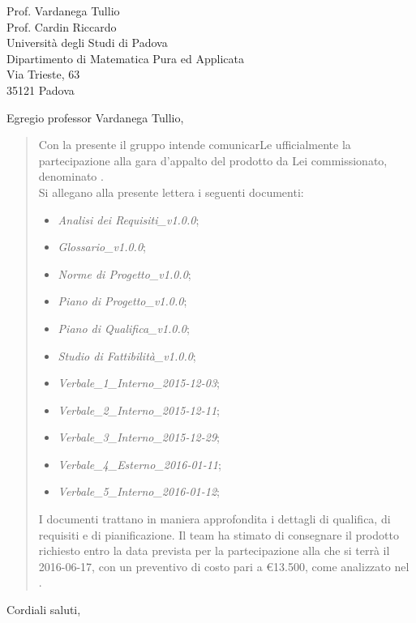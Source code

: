 \documentclass{letter}
\begin{document}

\begin{letter}{\hfill Prof. Vardanega Tullio \\
	\hfill Prof. Cardin Riccardo \\
	\hfill Università degli Studi di Padova \\
	\hfill Dipartimento di Matematica Pura ed Applicata \\
	\hfill Via Trieste, 63 \\
	\hfill 35121 Padova}

\date{}
\opening{Egregio professor Vardanega Tullio,}
 
	\begin{quotation}			
		Con la presente il gruppo \textit{\gruppo} intende comunicarLe ufficialmente la partecipazione alla gara d'appalto del prodotto da Lei commissionato, denominato \textbf{\progetto}.
		\\
		Si allegano alla presente lettera i seguenti documenti:
		\begin{itemize}
			\item \textit{Analisi dei Requisiti\_v1.0.0};
			\item \textit{Glossario\_v1.0.0};
			\item \textit{Norme di Progetto\_v1.0.0};
			\item \textit{Piano di Progetto\_v1.0.0};
			\item \textit{Piano di Qualifica\_v1.0.0};
			\item \textit{Studio di Fattibilità\_v1.0.0};
			\item \textit{Verbale\_1\_Interno\_2015-12-03};
			\item \textit{Verbale\_2\_Interno\_2015-12-11};
			\item \textit{Verbale\_3\_Interno\_2015-12-29};
			\item \textit{Verbale\_4\_Esterno\_2016-01-11};
			\item \textit{Verbale\_5\_Interno\_2016-01-12};
		\end{itemize}
		I documenti trattano in maniera approfondita i dettagli di qualifica, di requisiti e di pianificazione.	
		Il team ha stimato di consegnare il prodotto richiesto entro la data prevista per la partecipazione alla \textit{\RA} che si terrà il 2016-06-17, con un preventivo di costo pari a \euro13.500, come analizzato nel \textit{\PdP}.	
	\end{quotation}
	\closing{Cordiali saluti,}


\end{letter}
 
\end{document}
